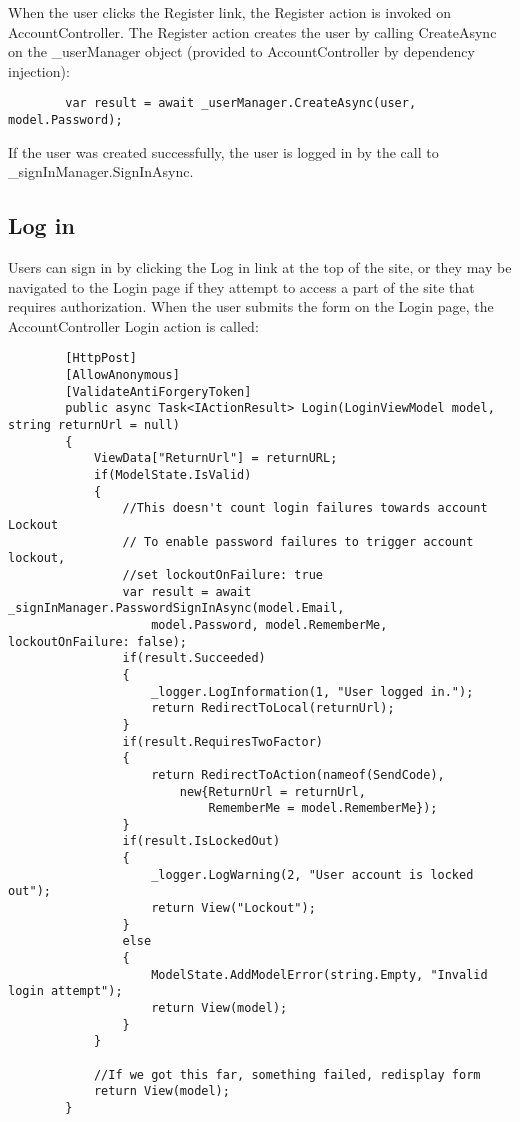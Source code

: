 \documentclass{report}
\begin{document}
    When the user clicks the Register link, the Register action is invoked on
    AccountController. The Register action creates the user by calling CreateAsync
    on the _userManager object (provided to AccountController by dependency injection):

    \lstset{style=sharpc}
    \begin{lstlisting}
        var result = await _userManager.CreateAsync(user, model.Password);
    \end{lstlisting}
    
    If the user was created successfully, the user is logged in by the call
    to _signInManager.SignInAsync.

    \subsection{Log in}
    Users can sign in by clicking the Log in link at the top of the site,
    or they may be navigated to the Login page if they attempt to access
    a part of the site that requires authorization. When the user submits
    the form on the Login page, the AccountController Login action is
    called:
    \lstset{style=sharpc}
    \begin{lstlisting}
        [HttpPost]
        [AllowAnonymous]
        [ValidateAntiForgeryToken]
        public async Task<IActionResult> Login(LoginViewModel model, string returnUrl = null)
        {
            ViewData["ReturnUrl"] = returnURL;
            if(ModelState.IsValid)
            {
                //This doesn't count login failures towards account Lockout
                // To enable password failures to trigger account lockout,
                //set lockoutOnFailure: true
                var result = await _signInManager.PasswordSignInAsync(model.Email,
                    model.Password, model.RememberMe, lockoutOnFailure: false);
                if(result.Succeeded)
                {
                    _logger.LogInformation(1, "User logged in.");
                    return RedirectToLocal(returnUrl);
                }
                if(result.RequiresTwoFactor)
                {
                    return RedirectToAction(nameof(SendCode),
                        new{ReturnUrl = returnUrl,
                            RememberMe = model.RememberMe});
                }
                if(result.IsLockedOut)
                {
                    _logger.LogWarning(2, "User account is locked out");
                    return View("Lockout");
                }
                else
                {
                    ModelState.AddModelError(string.Empty, "Invalid login attempt");
                    return View(model);
                }
            }

            //If we got this far, something failed, redisplay form
            return View(model);
        }
    \end{lstlisting}
\end{document}
